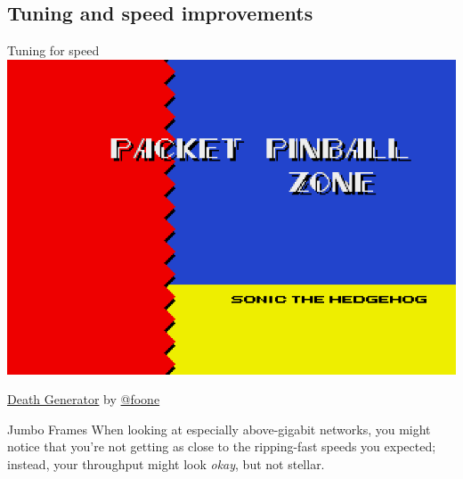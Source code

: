 \documentclass[bigger,aspectratio=169]{beamer}
\begin{document}
\subsection{Tuning and speed improvements}
\label{sec:orgb9c111a}
\begin{frame}{Tuning for speed}
    \centering
    \includegraphics[height=0.75\textheight]{./assets/packet-pinball.png}
    
    \raggedleft
    \small
    \href{http://deathgenerator.com}{Death Generator} by \href{https://twitter.com/foone}{@foone}
\end{frame}

\begin{frame}[label={sec:org13ce3d4}]{Jumbo Frames}
  When looking at especially above-gigabit networks, you might notice that you're not getting as close to the
  ripping-fast speeds you expected; instead, your throughput might look \textit{okay}, but not stellar.
\end{frame}
\end{document}
